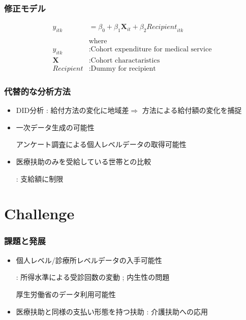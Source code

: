 \documentclass[dvipdfmx,14pt]{beamer}
\begin{document}
\begin{frame}\frametitle{修正モデル}

\begin{align*}
  y_{itk} &= \beta_0 + \beta_1 \mathbf{X}_{it} + \beta_2 \textit{Recipient}_{itk} \\
    \\
    & \text{where} \\
   y_{itk} &: \text{Cohort expenditure for medical service} \\
  \mathbf{X} &: \text{Cohort charactaristics} \\
  \textit{Recipient} &: \text{Dummy for recipient}
  \end{align*}

\end{frame}

\begin{frame}\frametitle{代替的な分析方法}

 \begin{itemize}
 
 \item DID分析 : 給付方法の変化に地域差$\Rightarrow$ 方法による給付額の変化を捕捉
 
 \item 一次データ生成の可能性
 
 アンケート調査による個人レベルデータの取得可能性
 
 \item 医療扶助のみを受給している世帯との比較
 
 : 支給額に制限
 
 \end{itemize}

\end{frame}

\section{Challenge}
\begin{frame}\frametitle{課題と発展}

 \begin{itemize}
 
 \item 個人レベル/診療所レベルデータの入手可能性
 
 : 所得水準による受診回数の変動 ; 内生性の問題
 
 厚生労働省のデータ利用可能性
 
 \item 医療扶助と同様の支払い形態を持つ扶助 : 介護扶助への応用 
 
 \end{itemize}

\end{frame}
\end{document}
